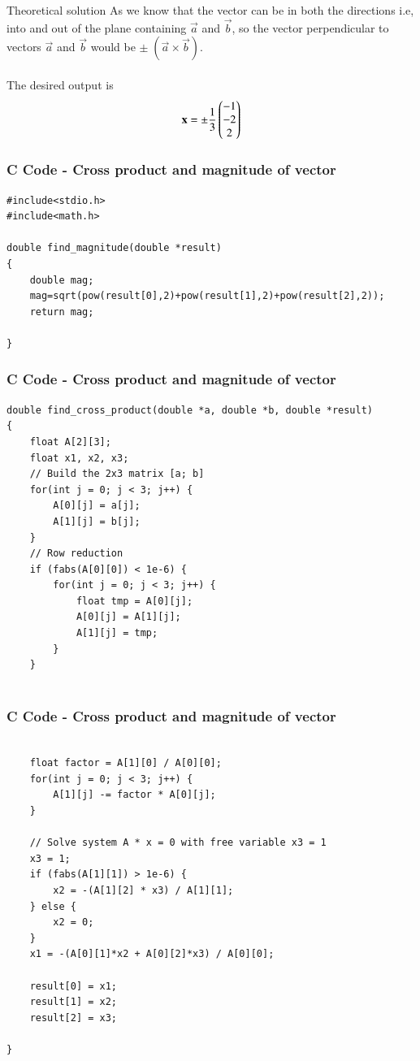 \documentclass{beamer}
\begin{document}
\begin{frame}{Theoretical solution}
    As we know that the vector can be in both the directions i.e, into and out of the plane containing $\vec{a}$ and $\vec{b}$, so the vector perpendicular to vectors $\vec{a}$ and $\vec{b}$ would be $\pm\;(\vec{a} \times \vec{b})$.\\
\\
The desired output is
\begin{align}
    \vec{x}=\pm\frac{1}{3}\myvec{-1\\-2\\2}
\end{align}
\end{frame}

\begin{frame}[fragile]
    \frametitle{C Code - Cross product and magnitude of vector}

    \begin{lstlisting}
#include<stdio.h>
#include<math.h>

double find_magnitude(double *result)
{
	double mag;
	mag=sqrt(pow(result[0],2)+pow(result[1],2)+pow(result[2],2));
	return mag;

}
    \end{lstlisting}
\end{frame}

\begin{frame}[fragile]
  \frametitle{C Code - Cross product and magnitude of vector}
  \begin{lstlisting}
double find_cross_product(double *a, double *b, double *result)
{
    float A[2][3];
    float x1, x2, x3;
    // Build the 2x3 matrix [a; b]
    for(int j = 0; j < 3; j++) {
        A[0][j] = a[j];
        A[1][j] = b[j];
    }
    // Row reduction
    if (fabs(A[0][0]) < 1e-6) {
        for(int j = 0; j < 3; j++) {
            float tmp = A[0][j];
            A[0][j] = A[1][j];
            A[1][j] = tmp;
        }
    }


  \end{lstlisting}
    
\end{frame}
\begin{frame}[fragile]
    \frametitle{C Code - Cross product and magnitude of vector}

    \begin{lstlisting}

    float factor = A[1][0] / A[0][0];
    for(int j = 0; j < 3; j++) {
        A[1][j] -= factor * A[0][j];
    }

    // Solve system A * x = 0 with free variable x3 = 1
    x3 = 1;
    if (fabs(A[1][1]) > 1e-6) {
        x2 = -(A[1][2] * x3) / A[1][1];
    } else {
        x2 = 0;
    }
    x1 = -(A[0][1]*x2 + A[0][2]*x3) / A[0][0];

    result[0] = x1;
    result[1] = x2;
    result[2] = x3;

}
    \end{lstlisting}
\end{frame}
\end{document}
